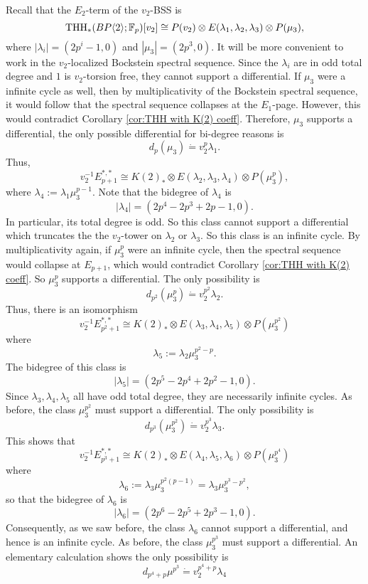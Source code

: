 Recall that the $E_2$-term of the $v_2$-BSS is 
\[
\operatorname{THH}_*(BP\langle 2 \rangle;\mathbb{F}_p)[v_2]\cong P(v_2) \otimes E(\lambda_1,\lambda_2,\lambda_3)\otimes P(\mu_3),
\]
where
$
|\lambda_i| = (2p^i-1, 0)
$
and 
$
|\mu_3|=(2p^3,0).
$
It will be more convenient to work in the $v_2$-localized Bockstein spectral sequence. Since the $\lambda_i$ are in odd total degree and $1$ is $v_2$-torsion free, they cannot support a differential. If $\mu_3$ were a infinite cycle as well, then by multiplicativity of the Bockstein spectral sequence, it would follow that the spectral sequence collapses at the $E_1$-page. However, this would contradict Corollary \ref{cor:THH with K(2) coeff}. Therefore, $\mu_3$ supports a differential, the only possible differential for bi-degree reasons is 
\[
d_p(\mu_3)\dot{=}v_2^p\lambda_1.
\]
Thus, 
\[
v_2^{-1}E_{p+1}^{*,*}\cong K(2)_*\otimes E(\lambda_2, \lambda_3, \lambda_4)\otimes P(\mu_3^{p}),
\]
where $\lambda_4:=\lambda_1\mu_3^{p-1}$. Note that the bidegree of $\lambda_4$ is
\[
|\lambda_4| = (2p^4-2p^3+2p-1,0).
\]
In particular, its total degree is odd. So this class cannot support a differential which truncates the the $v_2$-tower on $\lambda_2$ or $\lambda_3$. So this class is an infinite cycle. By multiplicativity again, if $\mu_3^p$ were an infinite cycle, then the spectral sequence would collapse at $E_{p+1}$, which would contradict Corollary \ref{cor:THH with K(2) coeff}. So $\mu_3^p$ supports a differential. The only possibility is 
\[
d_{p^2}(\mu_3^p) \dot{=} v_2^{p^2}\lambda_2.
\]  
Thus, there is an isomorphism
\[
v_2^{-1}E_{p^2+1}^{*,*}\cong K(2)_*\otimes E(\lambda_3, \lambda_4, \lambda_5)\otimes P(\mu_3^{p^2})
\]
where 
\[
\lambda_5:= \lambda_2\mu_3^{p^2-p}.
\]
The bidegree of this class is 
\[
|\lambda_5| = (2p^5-2p^4+2p^2-1,0).
\]
Since $\lambda_3, \lambda_4, \lambda_5$ all have odd total degree, they are necessarily infinite cycles. As before, the class $\mu_3^{p^2}$ must support a differential. The only possibility is 
\[
d_{p^3}(\mu_3^{p^2})\dot{=}v_2^{p^3}\lambda_3.
\]
This shows that 
\[
v_2^{-1}E_{p^3+1}^{*,*}\cong K(2)_*\otimes E(\lambda_4,\lambda_5, \lambda_6)\otimes P(\mu_3^{p^4})
\]
where
\[
\lambda_6:= \lambda_3\mu_3^{p^2(p-1)} = \lambda_3\mu_3^{p^3-p^2},
\]
so that the bidegree of $\lambda_6$ is 
\[
|\lambda_6|=(2p^6-2p^5+2p^3-1,0).
\]
Consequently, as we saw before, the class $\lambda_6$ cannot support a differential, and hence is an infinite cycle. As before, the class $\mu_3^{p^3}$ must support a differential. An elementary calculation shows the only possibility is 
\[
d_{p^4+p}\mu^{p^3}\dot{=} v_2^{p^4+p}\lambda_4
\]

